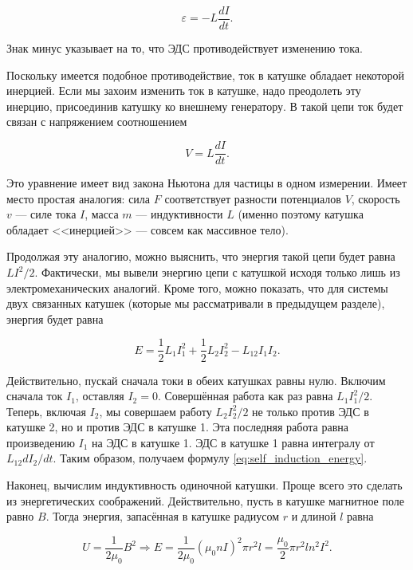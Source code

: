 \documentclass[12pt,a4paper]{article}
\numberwithin{equation}{section}
\numberwithin{equation}{section}
\newcommand{\vareps}{\varepsilon}
\begin{document}
\begin{equation}
  \label{eq:self_induction_3}
  \vareps = - L \frac{dI}{dt}. 
\end{equation}

Знак минус указывает на то, что ЭДС противодействует изменению тока. 

Поскольку имеется подобное противодействие, ток в катушке обладает
некоторой инерцией. Если мы захоим изменить ток в катушке, надо
преодолеть эту инерцию, присоединив катушку ко внешнему генератору. В
такой цепи ток будет связан с напряжением соотношением

\begin{equation}
  \label{eq:self_induction_4}
  V = L \frac{dI}{dt}.
\end{equation}

Это уравнение имеет вид закона Ньютона для частицы в одном
измерении. Имеет место простая аналогия: сила $F$ соответствует
разности потенциалов $V$, скорость $v$ --- силе тока $I$, масса $m$
--- индуктивности $L$ (именно поэтому катушка обладает <<инерцией>>
--- совсем как массивное тело). 

Продолжая эту аналогию, можно выяснить, что энергия такой цепи будет
равна $LI^2/2$. Фактически, мы вывели энергию цепи с катушкой исходя
только лишь из электромеханических аналогий. Кроме того, можно
показать, что для системы двух связанных катушек (которые мы
рассматривали в предыдущем разделе), энергия будет равна

\begin{equation}
  \label{eq:self_induction_energy}
  E = \frac12 L_1 I_1^2 + \frac12 L_2 I_2^2 - L_{12} I_1 I_2.
\end{equation}

Действительно, пускай сначала токи в обеих катушках равны
нулю. Включим сначала ток $I_1$, оставляя $I_2=0$. Совершённая работа
как раз равна $L_1 I_1^2/2$. Теперь, включая $I_2$, мы совершаем
работу $L_2 I_2^2/2$ не только против ЭДС в катушке 2, но и против ЭДС
в катушке 1. Эта последняя работа равна произведению $I_1$ на ЭДС в
катушке 1. ЭДС в катушке 1 равна интегралу от $L_{12} dI_2/dt$. Таким
образом, получаем формулу \eqref{eq:self_induction_energy}. 


Наконец, вычислим индуктивность одиночной катушки. Проще всего это
сделать из энергетических соображений. Действительно, пусть в катушке
магнитное поле равно $B$. Тогда энергия, запасённая в катушке радиусом
$r$ и длиной $l$ равна

\begin{equation}
  \label{eq:coil_energy_1}
  U = \frac{1}{2 \mu_0} B^2 \Rightarrow E = \frac{1}{2\mu_0} (\mu_0 n
  I)^2 \pi r^2 l = \frac{\mu_0}{2} \pi r^2 l n^2 I^2.
\end{equation}
\end{document}
